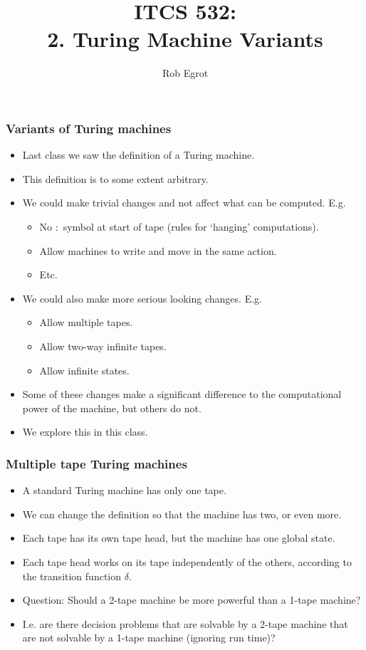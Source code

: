\documentclass[handout]{beamer}
\title{ITCS 532:\\ 
2. Turing Machine Variants}
\date{}
\author{Rob Egrot}
\begin{document}
\begin{frame}
\titlepage
\end{frame}

\begin{frame}
\frametitle{Variants of Turing machines}
\begin{itemize}
\item Last class we saw the definition of a Turing machine.
\item This definition is to some extent arbitrary.
\item We could make trivial changes and not affect what can be computed. E.g.
\begin{itemize}
\item No $:$ symbol at start of tape (rules for `hanging' computations).
\item Allow machines to write and move in the same action.
\item Etc.
\end{itemize}
\item We could also make more serious looking changes. E.g.
\begin{itemize}
\item Allow multiple tapes.
\item Allow two-way infinite tapes.
\item Allow infinite states.
\end{itemize}
\item Some of these changes make a significant difference to the computational power of the machine, but others do not.
\item We explore this in this class.
\end{itemize}

\end{frame}

\begin{frame}
\frametitle{Multiple tape Turing machines}
\begin{itemize}
\item A standard Turing machine has only one tape. 
\vspace{0.1cm}
\item We can change the definition so that the machine has two, or even more. 
\vspace{0.1cm}
\item Each tape has its own tape head, but the machine has one global state. 
\vspace{0.1cm}
\item Each tape head works on its tape independently of the others, according to the transition function $\delta$.
\vspace{0.1cm}
\item Question: Should a 2-tape machine be more powerful than a 1-tape machine?
\vspace{0.1cm}
\item I.e. are there decision problems that are solvable by a 2-tape machine that are not solvable by a 1-tape machine (ignoring run time)?
\end{itemize}

\end{frame}
\end{document}
